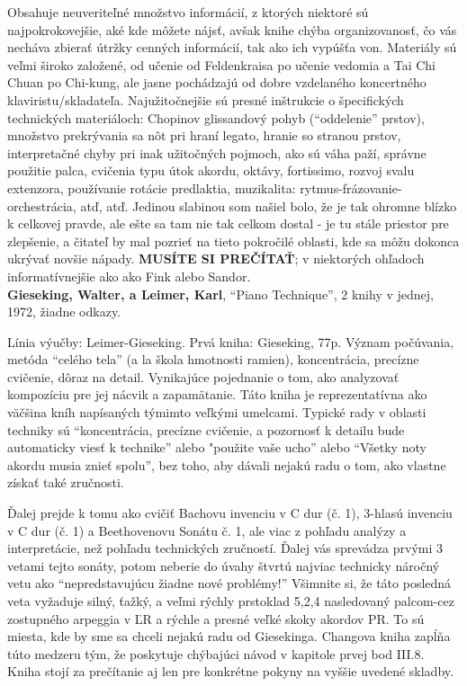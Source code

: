 \documentclass[11pt,a4paper]{book}
\begin{document}
Obsahuje neuveriteľné množstvo informácií, z ktorých niektoré sú najpokrokovejšie, aké kde môžete nájsť, avšak knihe chýba organizovanosť, čo vás necháva zbierať útržky cenných informácií, tak ako ich vypúšťa von. Materiály sú veľmi široko založené, od učenie od Feldenkraisa po učenie vedomia a Tai Chi Chuan po Chi-kung, ale jasne pochádzajú od dobre vzdelaného koncertného klaviristu/skladateľa. Najužitočnejšie sú presné inštrukcie o špecifických technických materiáloch: Chopinov glissandový pohyb (“oddelenie” prstov), množstvo prekrývania sa nôt pri hraní legato, hranie so stranou prstov, interpretačné chyby pri inak užitočných pojmoch, ako sú váha paží, správne použitie palca, cvičenia typu útok akordu, oktávy, fortissimo, rozvoj svalu extenzora, používanie rotácie predlaktia, muzikalita: rytmus-frázovanie-orchestrácia, atď, atď. Jedinou slabinou som našiel bolo, že je tak ohromne blízko k celkovej pravde, ale ešte sa tam nie tak celkom dostal - je tu stále priestor pre zlepšenie, a čitateľ by mal pozrieť na tieto pokročilé oblasti, kde sa môžu dokonca ukrývať novšie nápady. \textbf{MUSÍTE SI PREČÍTAŤ}; v niektorých ohľadoch informatívnejšie ako ako Fink alebo Sandor.
\medskip\\
\textbf{\hypertarget{r:gieseking}{Gieseking, Walter, a Leimer, Karl}}, “Piano Technique”, 2 knihy v jednej, 1972, žiadne odkazy.

Línia výučby: Leimer-Gieseking. Prvá kniha: Gieseking, 77p. Význam počúvania, metóda “celého tela” (a la škola hmotnosti ramien), koncentrácia, precízne cvičenie, dôraz na detail. Vynikajúce pojednanie o tom, ako analyzovať kompozíciu pre jej nácvik a zapamätanie. Táto kniha je reprezentatívna ako väčšina kníh napísaných týmimto veľkými umelcami. Typické rady v oblasti techniky sú “koncentrácia, precízne cvičenie, a pozornosť k detailu bude automaticky viesť k technike” alebo "použite vaše ucho” alebo “Všetky noty akordu musia znieť spolu”, bez toho, aby dávali nejakú radu o tom, ako vlastne získať také zručnosti. 

Ďalej prejde k tomu ako cvičiť Bachovu invenciu v C dur (č. 1), 3-hlasú invenciu v C dur (č. 1) a Beethovenovu Sonátu č. 1, ale viac z pohľadu analýzy a interpretácie, než pohľadu technických zručností. Ďalej vás sprevádza prvými 3 vetami tejto sonáty, potom neberie do úvahy štvrtú najviac technicky náročný vetu ako “nepredstavujúcu žiadne nové problémy!” Všimnite si, že táto posledná veta  vyžaduje silný, ťažký, a veľmi rýchly prstoklad 5,2,4 nasledovaný palcom-cez zostupného arpeggia v ĽR a rýchle a presné veľké skoky akordov PR. To sú miesta, kde by sme sa chceli nejakú radu od Giesekinga. Changova kniha zapĺňa túto medzeru tým, že poskytuje chýbajúci návod v kapitole prvej bod III.8. Kniha stojí za prečítanie aj len pre konkrétne pokyny na vyššie uvedené skladby. 
\end{document}
